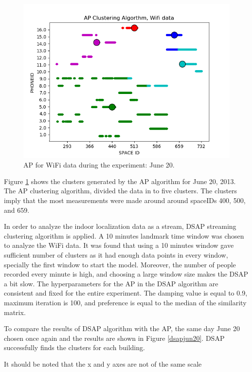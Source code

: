 \begin{figure}[!h]
    \centering
    \includegraphics[width = 10 cm]{image/Chapters/Chapter6/APJune20.png}
    \caption{ AP for WiFi data during the experiment: June 20.}
    \label{APUjoneday}
\end{figure}


Figure \ref{APUjoneday} shows the clusters generated by the AP algorithm for June 20, 2013. The AP clustering algorithm, divided the data in to five clusters. %
The clusters imply that the most measurements were made around around spaceIDs 400, 500, and 659. 

In order to analyze the indoor localization data as a stream, DSAP streaming clustering algorithm is applied. A 10 minutes landmark time window was chosen to analyze the WiFi data. It was found that using a 10 minutes window gave sufficient number of clusters as it had enough data points in every window, specially the first window to start the model. Moreover, the number of people recorded every minute is high, and choosing a large window size makes the DSAP a bit slow. The hyperparameters for the AP in the DSAP algorithm are consistent and fixed for the entire experiment. The damping value is equal to 0.9, maximum iteration is 100, and preference is equal to the median of the similarity matrix. 

To compare the results of DSAP algorithm with the AP, the same day June 20 chosen once again and the results are shown in Figure \ref{dsapjun20}. DSAP successfully finds the clusters for each building.





It should be noted that the x and y axes are not of the same scale   







